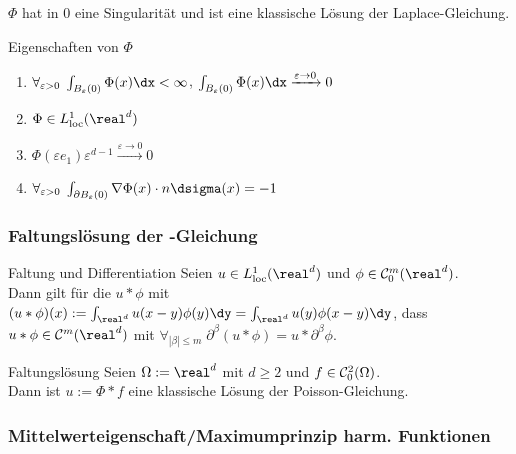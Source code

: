 \begin{Bem}
    $\Phi$ hat in $0$ eine Singularität und ist eine klassische Lösung der Laplace-Gleichung.
\end{Bem}

\linie

\begin{Lemma}{Eigenschaften von $\Phi$}
    \begin{enumerate}
        \item
        $\forall_{\varepsilon>0}\; \int_{B_\varepsilon(0)} \Phi(x)\dx < \infty$,\quad
        $\int_{B_\varepsilon(0)} \Phi(x)\dx \xrightarrow{\varepsilon \to 0} 0$
        
        \item
        $\Phi \in L^1_\loc(\real^d)$
        
        \item
        $\Phi(\varepsilon e_1) \varepsilon^{d-1} \xrightarrow{\varepsilon \to 0} 0$
        
        \item
        $\forall_{\varepsilon>0}\;
        \int_{\partial B_\varepsilon(0)} \nabla\Phi(x) \cdot n\dsigma(x) = -1$
    \end{enumerate}
\end{Lemma}

\subsubsection{%
    Faltungslösung der -Gleichung%
}

\begin{Satz}{Faltung und Dif{}ferentiation}
    Seien $u \in L^1_\loc(\real^d)$ und $\phi \in \C^m_0(\real^d)$.\\
    Dann gilt für die  $u \ast \phi$ mit
    $(u \ast \phi)(x) := \int_{\real^d} u(x-y)\phi(y) \dy
    = \int_{\real^d} u(y)\phi(x-y) \dy$, dass
    $u \ast \phi \in \C^m(\real^d)$ mit
    $\forall_{|\beta| \le m}\; \partial^\beta (u \ast \phi) = u \ast \partial^\beta \phi$.
\end{Satz}

\begin{Satz}{Faltungslösung}
    Seien $\Omega := \real^d$ mit $d \ge 2$ und $f \in \mathcal{C}^2_0(\Omega)$.\\
    Dann ist $u := \Phi \ast f$ eine klassische Lösung der Poisson-Gleichung.
\end{Satz}

\pagebreak

\subsubsection{%
    Mittelwerteigenschaft/Maximumprinzip harm. Funktionen%
}

